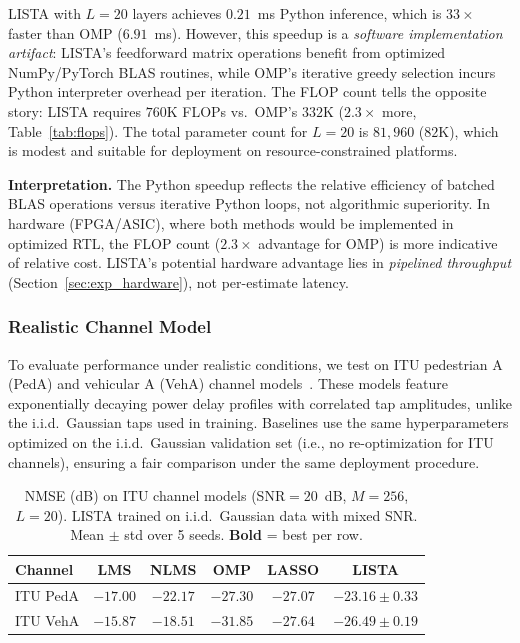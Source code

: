 \documentclass[a4paper,fleqn]{cas-sc}
\begin{document}
LISTA with $L=20$ layers achieves $0.21$~ms Python inference, which is $33\times$ faster than OMP ($6.91$~ms). However, this speedup is a \emph{software implementation artifact}: LISTA's feedforward matrix operations benefit from optimized NumPy/PyTorch BLAS routines, while OMP's iterative greedy selection incurs Python interpreter overhead per iteration. The FLOP count tells the opposite story: LISTA requires $760$K FLOPs vs.~OMP's $332$K ($2.3\times$ more, Table~\ref{tab:flops}). The total parameter count for $L=20$ is $81{,}960$ ($82$K), which is modest and suitable for deployment on resource-constrained platforms.

\textbf{Interpretation.} The Python speedup reflects the relative efficiency of batched BLAS operations versus iterative Python loops, not algorithmic superiority. In hardware (FPGA/ASIC), where both methods would be implemented in optimized RTL, the FLOP count ($2.3\times$ advantage for OMP) is more indicative of relative cost. LISTA's potential hardware advantage lies in \emph{pipelined throughput} (Section~\ref{sec:exp_hardware}), not per-estimate latency.

\subsubsection{Realistic Channel Model}

To evaluate performance under realistic conditions, we test on ITU pedestrian A (PedA) and vehicular A (VehA) channel models~\citep{itut2017guidelines}. These models feature exponentially decaying power delay profiles with correlated tap amplitudes, unlike the i.i.d.~Gaussian taps used in training. Baselines use the same hyperparameters optimized on the i.i.d.~Gaussian validation set (i.e., no re-optimization for ITU channels), ensuring a fair comparison under the same deployment procedure.

\begin{table}[width=.9\linewidth,cols=6,pos=!htbp]
\caption{NMSE (dB) on ITU channel models (SNR$=20$~dB, $M=256$, $L=20$). LISTA trained on i.i.d.~Gaussian data with mixed SNR. Mean $\pm$ std over 5 seeds. \textbf{Bold} = best per row.}\label{tab:itu}
\begin{tabular*}{\tblwidth}{@{} LCCCCC@{}}
\toprule
Channel & LMS & NLMS & OMP & LASSO & LISTA \\
\midrule
ITU PedA & $-17.00$ & $-22.17$ & $\bm{-27.30}$ & $-27.07$ & $-23.16 \pm 0.33$ \\
ITU VehA & $-15.87$ & $-18.51$ & $\bm{-31.85}$ & $-27.64$ & $-26.49 \pm 0.19$ \\
\bottomrule
\end{tabular*}
\end{table}
\end{document}
